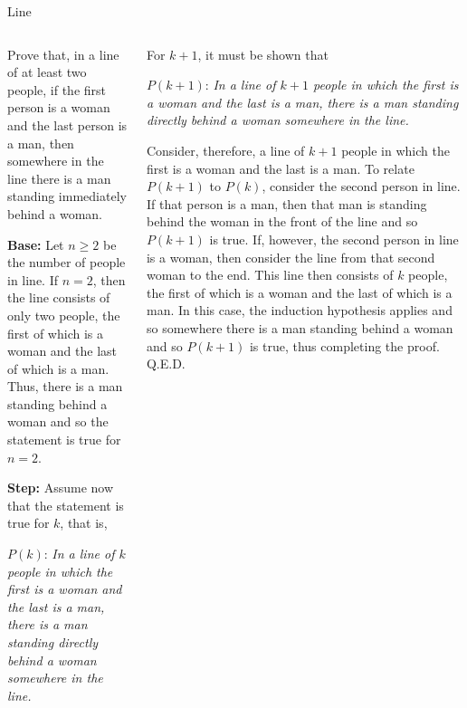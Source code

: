 \documentclass[9pt,aspectratio=169,handout]{beamer}
\begin{document}
\begin{frame}{Line}
  \begin{columns}[T]
    \begin{column}{0.5\textwidth}
      \begin{problem}
        Prove that, in a line of at least two people, if the first person is a woman and the last person is a man, then somewhere in the line there is a man standing immediately behind a woman.
      \end{problem}\pause

      \textbf{Base:} Let $n \geq 2$ be the number of people in line. If $n = 2$, then the line consists of only two people, the first of which is a woman and the last of which is a man. Thus, there is a man standing behind a woman and so the statement is true for $n = 2$.\pause

      \textbf{Step:} Assume now that the statement is true for $k$, that is, \smallskip

      $P(k)$: \emph{In a line of $k$ people in which the first is a woman and the last is a man, there is a man standing directly behind a woman somewhere in the line.}\pause
    \end{column}
    \begin{column}{0.5\textwidth}

      For $k + 1$, it must be shown that
      \smallskip

      $P(k+1)$: \emph{In a line of $k + 1$ people in which the first is a woman and the last is a man, there is a man standing directly behind a woman somewhere in the line.}
      \smallskip\pause

      Consider, therefore, a line of $k + 1$ people in which the first is a woman and the last is a man. To relate $P(k + 1)$ to $P(k)$, consider the second person in line. If that person is a man, then that man is standing behind the woman in the front of the line and so $P(k + 1)$ is true. If, however, the second person in line is a woman, then consider the line from that second woman to the end. This line then consists of $k$ people, the first of which is a woman and the last of which is a man. In this case, the induction hypothesis applies and so somewhere there is a man standing behind a woman and so $P(k + 1)$ is true, thus completing the proof. \hfill Q.E.D.
    \end{column}
  \end{columns}
\end{frame}
\end{document}
